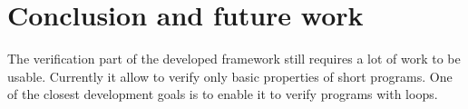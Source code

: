 




\section{Conclusion and future work}

The verification part of the developed framework still requires a lot of work to be usable. Currently it allow to verify only basic properties of short programs. One of the closest development goals is to enable it to verify programs with loops.

